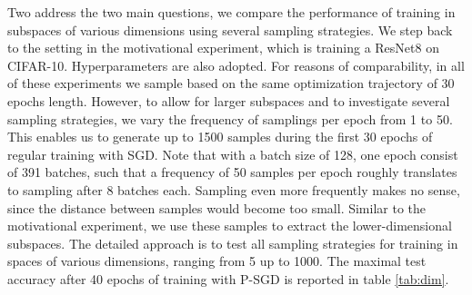 \documentclass[11pt, a4paper]{article}
\begin{document}
\pagebreak
Two address the two main questions, we compare the performance of training in subspaces of various dimensions using several sampling strategies. We step back to the setting in the motivational experiment, which is training a ResNet8 on CIFAR-10. Hyperparameters are also adopted. For reasons of comparability, in all of these experiments we sample based on the same optimization trajectory of 30 epochs length. However, to allow for larger subspaces and to investigate several sampling strategies, we vary the frequency of samplings per epoch from 1 to 50. This enables us to generate up to 1500 samples during the first 30 epochs of regular training with SGD. Note that with a batch size of 128, one epoch consist of 391 batches, such that a frequency of 50 samples per epoch roughly translates to sampling after 8 batches each. Sampling even more frequently makes no sense, since the distance between samples would become too small. Similar to the motivational experiment, we use these samples to extract the lower-dimensional subspaces. The detailed approach is to test all sampling strategies for training in spaces of various dimensions, ranging from 5 up to 1000. The maximal test accuracy after 40 epochs of training with P-SGD is reported in table \ref{tab:dim}.
\end{document}
